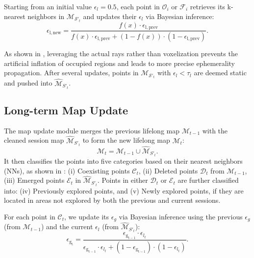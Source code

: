 Starting from an initial value \(\epsilon_{l} = 0.5\), each point in \(\mathcal{O}_i\) or \(\mathcal{F}_i\) retrieves its k-nearest neighbors in \(\mathcal{M}_{\mathcal{S}'_t}\) and updates their $\epsilon_{l}$ via Bayesian inference:
\begin{equation}
\epsilon_{\mathrm{l,new}} = \frac{f(x) \cdot \epsilon_{\mathrm{l,prev}}}{f(x) \cdot \epsilon_{\mathrm{l,prev}} + (1 - f(x)) \cdot (1 - \epsilon_{\mathrm{l,prev}})}.
\label{eq:6}
\end{equation}

As shown in , leveraging the actual rays rather than voxelization prevents the artificial inflation of occupied regions and leads to more precise ephemerality propagation.  
After several updates, points in \(\mathcal{M}_{\mathcal{S}'_t}\) with \(\epsilon_{l} < \tau_l\) are deemed static and pushed into \(\hat{\mathcal{M}}_{S'_t}\).

\subsection{Long-term Map Update}
\label{subsec:map_update}

The map update module merges the previous lifelong map \(\mathcal{M}_{t-1}\) with the cleaned session map \(\hat{\mathcal{M}}_{S'_t}\) to form the new lifelong map \(\mathcal{M}_{t}\):
\[
\mathcal{M}_{t} = \mathcal{M}_{t-1} \cup \hat{\mathcal{M}}_{S'_t}.
\]
It then classifies the points into five categories based on their nearest neighbors (NNs), as shown in : 
(i) Coexisting points \( \mathcal{C}_t \),
(ii) Deleted points \( \mathcal{D}_t \) from \( \mathcal{M}_{t-1} \),
(iii) Emerged points \( \mathcal{E}_t \) in \( \hat{\mathcal{M}}_{S'_t} \).
Points in either \( \mathcal{D}_t \) or \( \mathcal{E}_t \) are further classified into:
(iv) Previously explored points, and 
(v) Newly explored points, if they are located in areas not explored by both the previous and current sessions.

For each point in $\mathcal{C}_t$, we update its $\epsilon_{g}$ via Bayesian inference using the previous $\epsilon_{g}$ (from $\mathcal{M}_{t-1}$) and the current $\epsilon_{l}$ (from $\hat{\mathcal{M}}_{S'_t}$):
\begin{equation}
\epsilon_{\mathrm{g_t}} = 
\frac{\epsilon_{\mathrm{g_{t-1}}} \cdot \epsilon_{l_t}}
{\epsilon_{\mathrm{g_{t-1}}} \cdot \epsilon_{l_t} + (1 - \epsilon_{\mathrm{g_{t-1}}}) \cdot (1 - \epsilon_{l_t})}.
\label{eq:7}
\end{equation}

